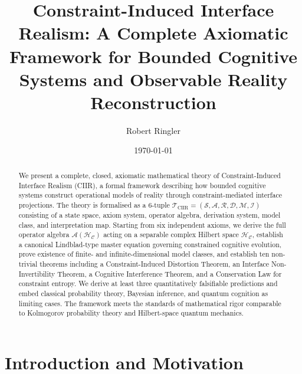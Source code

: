 \documentclass[twocolumn,aps,prd,superscriptaddress,nofootinbib]{revtex4-2}
\newcommand{\HC}{\mathcal{H}_{\mathcal{C}}}
\newcommand{\CR}{\mathcal{R}}
\newcommand{\CM}{\mathcal{M}}
\newcommand{\CS}{\mathcal{S}}
\newcommand{\CA}{\mathcal{A}}
\newcommand{\CD}{\mathcal{D}}
\newcommand{\CI}{\mathcal{I}}
\newcommand{\TCIIR}{\mathcal{T}_{\mathrm{CIIR}}}
\begin{document}
\title{Constraint-Induced Interface Realism: A Complete Axiomatic Framework
       for Bounded Cognitive Systems and Observable Reality Reconstruction}

\author{Robert Ringler}

\date{\today}

\begin{abstract}
We present a complete, closed, axiomatic mathematical theory of
Constraint-Induced Interface Realism (CIIR), a formal framework describing how
bounded cognitive systems construct operational models of reality through
constraint-mediated interface projections.  The theory is formalised as a
6-tuple $\TCIIR = (\CS, \CA, \CR, \CD, \CM, \CI)$ consisting of a state space,
axiom system, operator algebra, derivation system, model class, and
interpretation map.  Starting from six independent axioms, we derive the full
operator algebra $\CA(\HC)$ acting on a separable complex Hilbert space $\HC$,
establish a canonical Lindblad-type master equation governing constrained
cognitive evolution, prove existence of finite- and infinite-dimensional model
classes, and establish ten non-trivial theorems including a Constraint-Induced
Distortion Theorem, an Interface Non-Invertibility Theorem, a Cognitive
Interference Theorem, and a Conservation Law for constraint entropy.  We derive
at least three quantitatively falsifiable predictions and embed classical
probability theory, Bayesian inference, and quantum cognition as limiting cases.
The framework meets the standards of mathematical rigor comparable to
Kolmogorov probability theory and Hilbert-space quantum mechanics.
\end{abstract}


\maketitle

\section{Introduction and Motivation}
\label{sec:intro}
\end{document}
